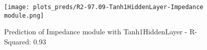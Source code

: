 
\begin{figure}[H]
    \centering
    \texttt{[image: plots\_preds/R2-97.09-Tanh1HiddenLayer-Impedance module.png]}
    \caption{Prediction of Impedance module with Tanh1HiddenLayer - R-Squared: 0.93}
\end{figure}
